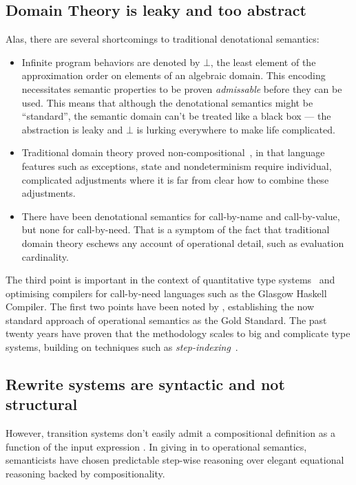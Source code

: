 \subsection{Domain Theory is leaky and too abstract}
Alas, there are several shortcomings to traditional denotational semantics:
\begin{itemize}
  \item Infinite program behaviors are denoted by $\bot$, the least element of
        the approximation order on elements of an algebraic domain.
        This encoding necessitates semantic properties to be proven
        \emph{admissable} before they can be used. This means that although
        the denotational semantics might be ``standard'', the semantic domain
        can't be treated like a black box --- the abstraction is leaky and
        $\bot$ is lurking everywhere to make life complicated.
  \item Traditional domain theory proved non-compositional~\cite{WrightFelleisen:94},
        in that language features such as exceptions, state and nondeterminism
        require individual, complicated adjustments where it is far from clear
        how to combine these adjustments.
  \item There have been denotational semantics for call-by-name and
        call-by-value, but none for call-by-need. That is a symptom of the fact
        that traditional domain theory eschews any account of operational
        detail, such as evaluation cardinality.
\end{itemize}

The third point is important in the context of quantitative type
systems~\cite{Atkey:18} and optimising compilers for call-by-need languages such
as the Glasgow Haskell Compiler.
The first two points have been noted by \citep{WrightFelleisen:94}, establishing
the now standard approach of operational semantics as the Gold Standard.
The past twenty years have proven that the methodology scales to
big and complicate type systems, building on techniques such as
\emph{step-indexing}~\cite{AppelMcAllester:01,DreyerAhmedBirkedal:11}.

\subsection{Rewrite systems are syntactic and not structural}
However, transition systems don't easily admit a compositional definition as a
function of the input expression . In giving in to operational
semantics, semanticists have chosen predictable step-wise reasoning over elegant
equational reasoning backed by compositionality.

